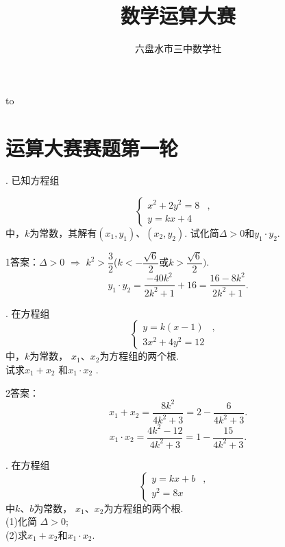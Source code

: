 \documentclass[UTF8]{ctexart}
\title{数学运算大赛}
\author{六盘水市三中数学社}
\date{}
\newcommand{\myem}[1]{{\bfseries\color{red} #1}}
\newcommand{\Warning}{\myem{\Large \rule{0pt}{1.4em}内部资料，请勿外传}}
\newcommand{\warning}{\cleaders\hbox to \linewidth{\hss\Warning\hss}\vfill}
\begin{document}
\maketitle
\warning
\clearpage

\section{运算大赛赛题第一轮}

. 已知方程组

\begin{equation*}
\left\{
\begin{aligned}
x^2+2y^2=8&,& \\
y=kx+4& &
\end{aligned}
\right.
\end{equation*}
中，$k$为常数，其解有$(x_1,y_1)$、$(x_2,y_2)$. 试化简$\Delta>0$和$y_1\cdot y_2$.
\vspace{3cm}


1答案：$\Delta>0$ $\Rightarrow$ $k^2>\dfrac32$\;($k<-\dfrac{\sqrt6}2$或$k>\dfrac{\sqrt6}2)$.
  $$y_1\cdot y_2=\dfrac{-40k^2}{2k^2+1}+16=\dfrac{16-8k^2}{2k^2+1}.$$


  \newpage

. 在方程组\begin{equation*}
\left\{
\begin{aligned}
 y=k(x-1)&,& \\
 3x^2+4y^2=12& &
\end{aligned}
\right.
\end{equation*}中，$k$为常数， $x_1$、$x_2$为方程组的两个根. \\
试求$x_1+x_2$ 和$x_1\cdot x_2$ .
 \vspace{3cm}

   
2答案： $$x_1+ x_2=\dfrac{8k^2}{4k^2+3}=2-\dfrac{6}{4k^2+3}.$$
 $$x_1\cdot x_2=\dfrac{4k^2-12}{4k^2+3}=1-\dfrac{15}{4k^2+3}.$$
  

 \newpage

. 在方程组\begin{equation*}
\left\{
\begin{aligned}
 y=kx+b&,& \\
 y^2=8x& &
\end{aligned}
\right.
\end{equation*}中$k$、$b$为常数， $x_1$、$x_2$为方程组的两个根. \\
(1)化简 $\Delta>0$;\\
(2)求$x_1+ x_2$和$x_1\cdot x_2$.\vspace{3cm}
\end{document}
